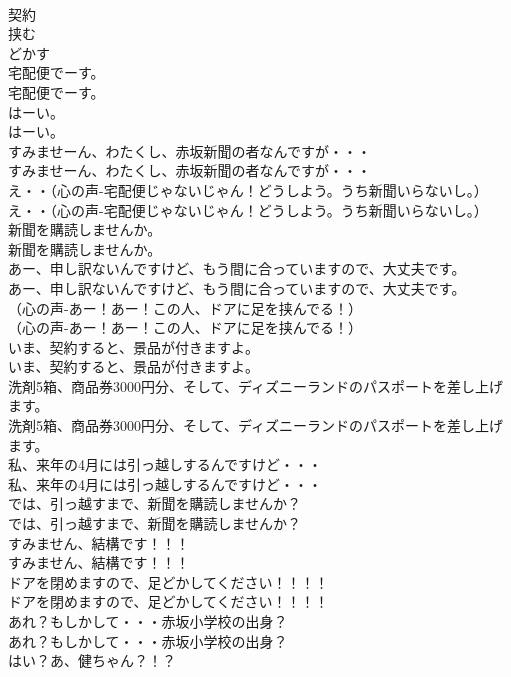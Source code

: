 \documentclass[8pt]{extreport}
\begin{document}
\begin{CJK}{UTF8}{min}
\\	契約
\\	挟む
\\	どかす
\\	宅配便でーす。	
\\	宅配便でーす。 
\\	はーい。	
\\	はーい。 
\\	すみませーん、わたくし、赤坂新聞の者なんですが・・・	
\\	すみませーん、わたくし、赤坂新聞の者なんですが・・・ 
\\	え・・（心の声-宅配便じゃないじゃん！どうしよう。うち新聞いらないし。）	
\\	え・・（心の声-宅配便じゃないじゃん！どうしよう。うち新聞いらないし。） 
\\	新聞を購読しませんか。	
\\	新聞を購読しませんか。 
\\	あー、申し訳ないんですけど、もう間に合っていますので、大丈夫です。	
\\	あー、申し訳ないんですけど、もう間に合っていますので、大丈夫です。 
\\	（心の声-あー！あー！この人、ドアに足を挟んでる！）	
\\	（心の声-あー！あー！この人、ドアに足を挟んでる！） 
\\	いま、契約すると、景品が付きますよ。	
\\	いま、契約すると、景品が付きますよ。 
\\	洗剤5箱、商品券3000円分、そして、ディズニーランドのパスポートを差し上げます。	
\\	洗剤5箱、商品券3000円分、そして、ディズニーランドのパスポートを差し上げます。 
\\	私、来年の4月には引っ越しするんですけど・・・	
\\	私、来年の4月には引っ越しするんですけど・・・ 
\\	では、引っ越すまで、新聞を購読しませんか？	
\\	では、引っ越すまで、新聞を購読しませんか？ 
\\	すみません、結構です！！！	
\\	すみません、結構です！！！ 
\\	ドアを閉めますので、足どかしてください！！！！	
\\	ドアを閉めますので、足どかしてください！！！！ 
\\	あれ？もしかして・・・赤坂小学校の出身？	
\\	あれ？もしかして・・・赤坂小学校の出身？ 
\\	はい？あ、健ちゃん？！？	

\end{CJK}
\end{document}
